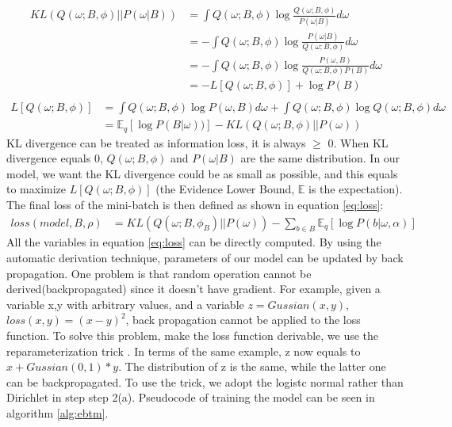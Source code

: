 \begin{equation}
    \begin{aligned}
        KL(Q(\omega;B,\phi)||P(\omega|B)) & = \int Q(\omega;B,\phi)\log\frac{Q(\omega;B,\phi)}{P(\omega|B)} d\omega\\
        & = - \int Q(\omega;B,\phi)\log\frac{P(\omega|B)}{Q(\omega;B,\phi)} d\omega\\
        & = - \int Q(\omega;B,\phi)\log\frac{P(\omega, B)}{Q(\omega;B,\phi)P(B)} d\omega\\
        & = - L[Q(\omega;B,\phi)] + \log P(B)\\
    \end{aligned} 
    \label{eq:KL}
\end{equation}
\begin{equation}
    \begin{aligned}
    L[Q(\omega;B,\phi)] & = \int Q(\omega;B,\phi)\log P(\omega, B) d\omega + \int Q(\omega;B,\phi) \log Q(\omega;B,\phi) d\omega\\
    & = \mathbb{E}_q[\log P(B|\omega))] - KL(Q(\omega;B,\phi)||P(\omega))
    \end{aligned} 
    \label{eq:elbo}
\end{equation}
KL divergence can be treated as information loss, it is always $\geq$ 0. When KL divergence equals 0, $Q(\omega;B,\phi)$ and $P(\omega|B)$ are the same distribution. In our model, we want the KL divergence could be as small as possible, and this equals to maximize $L[Q(\omega;B,\phi)]$ (the Evidence Lower Bound, $\mathbb{E}$ is the expectation). The final loss of the mini-batch is then defined as shown in equation \ref{eq:loss}:
\begin{equation}
    \begin{aligned}
        loss(model, B, \rho) & = KL(Q(\omega;B,\phi_B)||P(\omega)) - \sum_{b \in B}\mathbb{E}_q\left[\log P(b|\omega,\alpha)\right] 
    \end{aligned}    
    \label{eq:loss}
\end{equation}
All the variables in equation \ref{eq:loss} can be directly computed. By using the automatic derivation technique, parameters of our model can be updated by back propagation. One problem is that random operation cannot be derived(backpropagated) since it doesn't have gradient. For example, given a variable x,y with arbitrary values, and a variable $z = Gussian(x,y)$, $loss(x,y) = (x-y)^2$, back propagation cannot be applied to the loss function. To solve this problem, make the loss function derivable, we use the reparameterization trick \cite{kingma2013auto}. In terms of the same example, z now equals to $x + Gussian(0,1) * y$. The distribution of z is the same, while the latter one can be backpropagated. To use the trick, we adopt the logistc normal rather than Dirichlet in step step 2(a). Pseudocode of training the model can be seen in algorithm \ref{alg:ebtm}.
